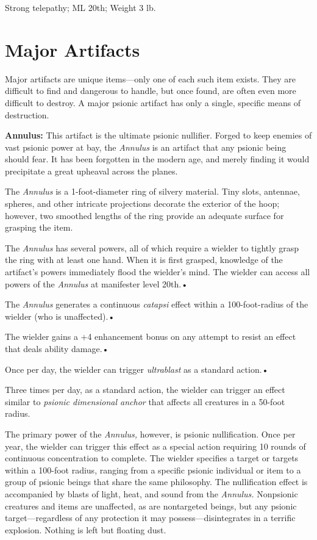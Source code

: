 \documentclass{article}
\begin{document}
Strong telepathy; ML 20th; Weight 3 lb. 

\vspace{12pt}
\section*{\textbf{Major Artifacts}}

Major artifacts are unique items---only one of each such item exists. They are 
difficult to find and dangerous to handle, but once found, are often even more 
difficult to destroy. A major psionic artifact has only a single, specific means 
of destruction.

\textbf{Annulus: }This artifact is the ultimate psionic nullifier. Forged to keep 
enemies of vast psionic power at bay, the \textit{Annulus }is an artifact that 
any psionic being should fear. It has been forgotten in the modern age, and merely 
finding it would precipitate a great upheaval across the planes.

The \textit{Annulus }is a 1-foot-diameter ring of silvery material. Tiny slots, 
antennae, spheres, and other intricate projections decorate the exterior of the 
hoop; however, two smoothed lengths of the ring provide an adequate surface for 
grasping the item.

The \textit{Annulus }has several powers, all of which require a wielder to tightly 
grasp the ring with at least one hand. When it is first grasped, knowledge of the 
artifact's powers immediately flood the wielder's mind. The wielder can access 
all powers of the \textit{Annulus }at manifester level 20th.• 

\parindent=3pt
The \textit{Annulus }generates a continuous \textit{catapsi }effect within a 100-foot-radius 
of the wielder (who is unaffected).• 

The wielder gains a +4 enhancement bonus on any attempt to resist an effect that 
deals ability damage.• 

\parindent=7pt
Once per day, the wielder can trigger \textit{ultrablast }as a standard action.• 

\parindent=3pt
Three times per day, as a standard action, the wielder can trigger an effect similar 
to \textit{psionic dimensional anchor }that affects all creatures in a 50-foot 
radius.

\parindent=0pt
The primary power of the \textit{Annulus, }however, is psionic nullification. Once 
per year, the wielder can trigger this effect as a special action requiring 10 
rounds of continuous concentration to complete. The wielder specifies a target 
or targets within a 100-foot radius, ranging from a specific psionic individual 
or item to a group of psionic beings that share the same philosophy. The nullification 
effect is accompanied by blasts of light, heat, and sound from the \textit{Annulus. 
}Nonpsionic creatures and items are unaffected, as are nontargeted beings, but 
any psionic target---regardless of any protection it may possess---disintegrates 
in a terrific explosion. Nothing is left but floating dust.
\end{document}
